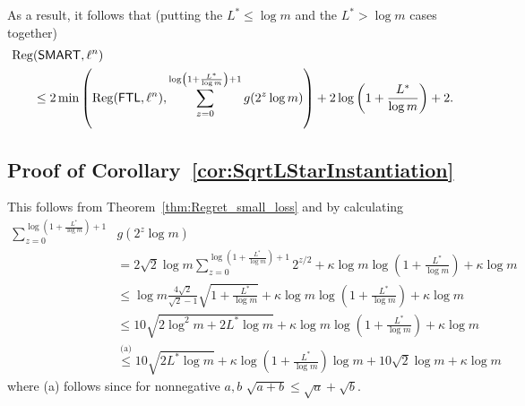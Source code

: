 As a result, it follows that (putting the $L^* \le \log m$ and the $L^* > \log m$ cases together) 
\begin{align}
\mathrm{Reg}&(\mathsf{SMART}, \ell^n)  \nonumber\\
&\leq 2 \min\left(\mathrm{Reg}(\mathsf{FTL}, \ell^n), \sum_{z = 0}^{\log\left(1+\frac{L^*}{\log m}\right)+1} g(2^z \log m)\right) + 2 \log\left(1+\frac{L^*}{\log m}\right)+2.
\end{align}


\subsection{Proof of Corollary~\ref{cor:SqrtLStarInstantiation}}
 This follows from Theorem~\ref{thm:Regret_small_loss} and by calculating 
    \begin{align}
        \sum_{z=0}^{\log\left(1+\frac{L^*}{\log m}\right)+1} &g(2^z \log m) \nonumber\\
        &= 2\sqrt{2}\log m \sum_{z=0}^{\log\left(1+\frac{L^*}{\log m}\right)+1} 2^{z/2} + \kappa \log m \log\left(1+\frac{L^*}{\log m}\right) + \kappa \log m\nonumber\\
        &\le  \log m \frac{4\sqrt{2}}{\sqrt{2}-1}\sqrt{1+\frac{L^*}{\log m}} + \kappa \log m \log\left(1+\frac{L^*}{\log m}\right)+ \kappa \log m \nonumber \\
        &\le 10 \sqrt{2\log^2 m + 2L^* \log m} + \kappa \log m \log\left(1+\frac{L^*}{\log m}\right) + \kappa \log m \nonumber\\
        &\stackrel{\text{(a)}}{\le} 10 \sqrt{2L^* \log m} + \kappa\log\left(1+\frac{L^*}{\log m}\right)\log m + 10\sqrt{2} \log m + \kappa \log m \nonumber
    \end{align}
    where (a) follows since for nonnegative $a,b$ $\sqrt{a+b} \le \sqrt{a}+ \sqrt{b}$.

